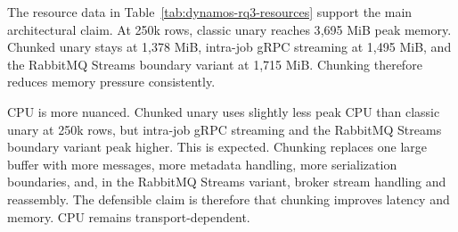 \begin{table}[!t]
    \centering
    \scriptsize
    \caption{Peak sampled resource usage during DYNAMOS bulk retrieval. CPU is peak total millicores; memory is peak total MiB across sampled Kubernetes namespaces.}
    \label{tab:dynamos-rq3-resources}
    \setlength{\tabcolsep}{3pt}
\end{table}

The resource data in Table~\ref{tab:dynamos-rq3-resources} support the main architectural claim. At 250k rows, classic unary reaches 3{,}695 MiB peak memory. Chunked unary stays at 1{,}378 MiB, intra-job gRPC streaming at 1{,}495 MiB, and the RabbitMQ Streams boundary variant at 1{,}715 MiB. Chunking therefore reduces memory pressure consistently.

CPU is more nuanced. Chunked unary uses slightly less peak CPU than classic unary at 250k rows, but intra-job gRPC streaming and the RabbitMQ Streams boundary variant peak higher. This is expected. Chunking replaces one large buffer with more messages, more metadata handling, more serialization boundaries, and, in the RabbitMQ Streams variant, broker stream handling and reassembly. The defensible claim is therefore that chunking improves latency and memory. CPU remains transport-dependent.

